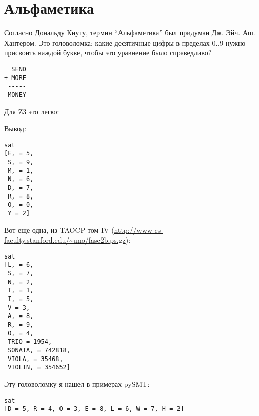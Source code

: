 \section{Альфаметика}

Согласно Дональду Кнуту, термин ``Альфаметика'' был придуман Дж. Эйч. Аш. Хантером.
Это головоломка: какие десятичные цифры в пределах 0..9 нужно присвоить каждой букве, чтобы это уравнение было справедливо?

\begin{lstlisting}
  SEND
+ MORE
 -----
 MONEY
\end{lstlisting}

Для Z3 это легко:



Вывод:

\begin{lstlisting}
sat
[E, = 5,
 S, = 9,
 M, = 1,
 N, = 6,
 D, = 7,
 R, = 8,
 O, = 0,
 Y = 2]
\end{lstlisting}

Вот еще одна, из \ac{TAOCP} том IV (\url{http://www-cs-faculty.stanford.edu/~uno/fasc2b.ps.gz}):



\begin{lstlisting}
sat
[L, = 6,
 S, = 7,
 N, = 2,
 T, = 1,
 I, = 5,
 V = 3,
 A, = 8,
 R, = 9,
 O, = 4,
 TRIO = 1954,
 SONATA, = 742818,
 VIOLA, = 35468,
 VIOLIN, = 354652]
\end{lstlisting}

Эту головоломку я нашел в примерах pySMT:



\begin{lstlisting}
sat
[D = 5, R = 4, O = 3, E = 8, L = 6, W = 7, H = 2]
\end{lstlisting}

